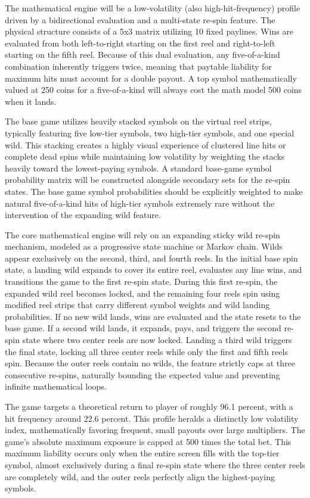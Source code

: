\documentclass[12pt,twoside,openany]{book}
\begin{document}
The mathematical engine will be a low-volatility (also high-hit-frequency) profile driven by a bidirectional evaluation and a multi-state re-spin feature. The physical structure consists of a 5x3 matrix utilizing 10 fixed paylines. Wins are evaluated from both left-to-right starting on the first reel and right-to-left starting on the fifth reel. Because of this dual evaluation, any five-of-a-kind combination inherently triggers twice, meaning that paytable liability for maximum hits must account for a double payout. A top symbol mathematically valued at 250 coins for a five-of-a-kind will always cost the math model 500 coins when it lands.

The base game utilizes heavily stacked symbols on the virtual reel strips, typically featuring five low-tier symbols, two high-tier symbols, and one special wild. This stacking creates a highly visual experience of clustered line hits or complete dead spins while maintaining low volatility by weighting the stacks heavily toward the lowest-paying symbols. A standard base-game symbol probability matrix will be constructed alongside secondary sets for the re-spin states. The base game symbol probabilities should be explicitly weighted to make natural five-of-a-kind hits of high-tier symbols extremely rare without the intervention of the expanding wild feature.

The core mathematical engine will rely on an expanding sticky wild re-spin mechanism, modeled as a progressive state machine or Markov chain. Wilds appear exclusively on the second, third, and fourth reels. In the initial base spin state, a landing wild expands to cover its entire reel, evaluates any line wins, and transitions the game to the first re-spin state. During this first re-spin, the expanded wild reel becomes locked, and the remaining four reels spin using modified reel strips that carry different symbol weights and wild landing probabilities. If no new wild lands, wins are evaluated and the state resets to the base game. If a second wild lands, it expands, pays, and triggers the second re-spin state where two center reels are now locked. Landing a third wild triggers the final state, locking all three center reels while only the first and fifth reels spin. Because the outer reels contain no wilds, the feature strictly caps at three consecutive re-spins, naturally bounding the expected value and preventing infinite mathematical loops.

The game targets a theoretical return to player of roughly 96.1 percent, with a hit frequency around 22.6 percent. This profile heralds a distinctly low volatility index, mathematically favoring frequent, small payouts over large multipliers. The game's absolute maximum exposure is capped at 500 times the total bet. This maximum liability occurs only when the entire screen fills with the top-tier symbol, almost exclusively during a final re-spin state where the three center reels are completely wild, and the outer reels perfectly align the highest-paying symbols.
\end{document}
